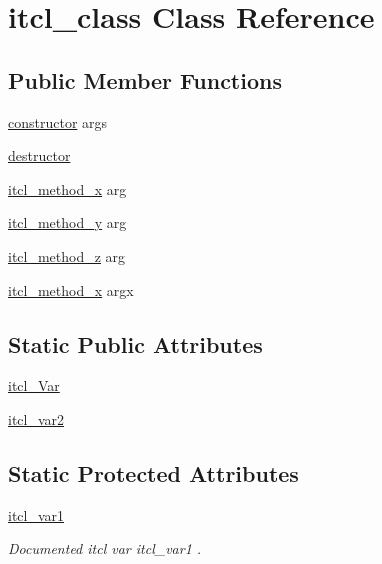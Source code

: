 \hypertarget{classns_1_1itcl__class}{}\section{itcl\+\_\+class Class Reference}
\label{classns_1_1itcl__class}
\subsection*{Public Member Functions}
\begin{DoxyCompactItemize}
\item 
\hyperlink{classns_1_1itcl__class_a774a51943bf6609f7582ee38c55a13f0}{constructor} args
\item 
\hyperlink{classns_1_1itcl__class_aa04747d49a3a74e75fcfdaf017a73877}{destructor}
\item 
\hyperlink{classns_1_1itcl__class_ac6935d07ea2c4734cdc930c839ee8c8b}{itcl\+\_\+method\+\_\+x} arg
\item 
\hyperlink{classns_1_1itcl__class_aebc048061815775e39d37da80986eaad}{itcl\+\_\+method\+\_\+y} arg
\item 
\hyperlink{classns_1_1itcl__class_a173dffcfe26dd79837a07bbdcf68b0ca}{itcl\+\_\+method\+\_\+z} arg
\item 
\hyperlink{classns_1_1itcl__class_af59b0413efa3edddf396f90765a7dbb0}{itcl\+\_\+method\+\_\+x} argx
\end{DoxyCompactItemize}
\subsection*{Static Public Attributes}
\begin{DoxyCompactItemize}
\item 
\hyperlink{classns_1_1itcl__class_ad36615943b6e0b072f672602111414e7}{itcl\+\_\+\+Var}
\item 
\hyperlink{classns_1_1itcl__class_abef47039b3eb290a7ee36c12a800fd6e}{itcl\+\_\+var2}
\end{DoxyCompactItemize}
\subsection*{Static Protected Attributes}
\begin{DoxyCompactItemize}
\item 
\hyperlink{classns_1_1itcl__class_a1cf74cf501971e5432041e21fd6968a3}{itcl\+\_\+var1}
\begin{DoxyCompactList}\small\item\em Documented itcl var {\ttfamily itcl\+\_\+var1} . \end{DoxyCompactList}\end{DoxyCompactItemize}


